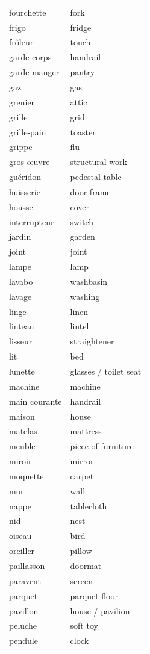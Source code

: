 \documentclass[12pt,a4paper]{article}
\begin{document}
\begin{longtable}{p{4cm} p{6cm}}
fourchette & fork \\
frigo & fridge \\
frôleur & touch \\
garde-corps & handrail \\
garde-manger & pantry \\
gaz & gas \\
grenier & attic \\
grille & grid \\
grille-pain & toaster \\
grippe & flu \\
gros œuvre & structural work \\
guéridon & pedestal table \\
huisserie & door frame \\
housse & cover \\
interrupteur & switch \\
jardin & garden \\
joint & joint \\
lampe & lamp \\
lavabo & washbasin \\
lavage & washing \\
linge & linen \\
linteau & lintel \\
lisseur & straightener \\
lit & bed \\
lunette & glasses / toilet seat \\
machine & machine \\
main courante & handrail \\
maison & house \\
matelas & mattress \\
meuble & piece of furniture \\
miroir & mirror \\
moquette & carpet \\
mur & wall \\
nappe & tablecloth \\
nid & nest \\
oiseau & bird \\
oreiller & pillow \\
paillasson & doormat \\
paravent & screen \\
parquet & parquet floor \\
pavillon & house / pavilion \\
peluche & soft toy \\
pendule & clock \\

\end{longtable}
\end{document}
